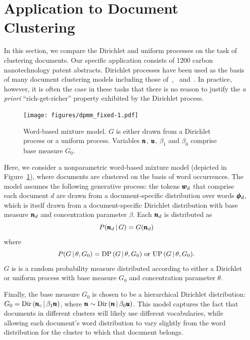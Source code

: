\documentclass[]{article}
\begin{document}
\section{Application to Document Clustering}\label{application}

In this section, we compare the Dirichlet and uniform processes
on the task of clustering documents.  Our specific application consists of 1200 carbon nanotechnology patent abstracts.  Dirichlet processes have been
used as the basis of many document clustering models including those
of~\cite{ZhaGhaYan05},~\cite{ZhuGhaLaf05} and~\cite{Wal08}. In practice, however, it is often the
case in these tasks that there is no reason to justify the \emph{a priori}
``rich-get-richer'' property exhibited by the Dirichlet process.

\begin{figure}[t]
{\hfill
\texttt{[image: figures/dpmm\_fixed-1.pdf]}
\hfill}
\caption{Word-based mixture model. $G$ is either drawn from a
  Dirichlet process or a uniform process. Variables $\pmb{n}$, $\pmb{u}$,
  $\beta_1$ and $\beta_0$ comprise base measure $G_0$.}
\label{fig:dpmm}
\end{figure}

Here, we consider a nonparametric word-based mixture model
(depicted in Figure~\ref{fig:dpmm}), where documents are clustered on
the basis of word occurrences. The model assumes the following
generative process: the tokens $\pmb{w}_d$ that comprise each document $d$
are drawn from a document-specific distribution over words $\pmb{\phi}_d$,
which is itself drawn from a document-specific Dirichlet distribution
with base measure $\pmb{n}_d$ and concentration parameter $\beta$. Each
$\pmb{n}_d$ is distributed as
\begin{equation}
P(\pmb{n}_d \,|\, G) = G(\pmb{n}_d)
\end{equation}
where
\begin{equation}
P(G \,|\, \theta, G_0) = \textrm{DP}\,(G \,|\, \theta, G_0) \textrm{ or } \textrm{UP}\,(G \,|\,
\theta, G_0).
\end{equation}
$G$ is is a random probability measure distributed according to either
a Dirichlet or uniform process with base measure $G_0$ and
concentration parameter $\theta$. 

Finally, the base measure $G_0$ is chosen to be a hierarchical
Dirichlet distribution: $G_0 = \textrm{Dir}\,(\pmb{n}_{c} \,|\, \beta_1
\pmb{n})$, where $\pmb{n} \sim \textrm{Dir}\,(\pmb{n} \,|\, \beta_0 \pmb{u})$. This model
captures the fact that documents in different clusters will likely 
use different vocabularies, while allowing each document's word
distribution to vary slightly from the word distribution for the
cluster to which that document belongs.    
\end{document}
